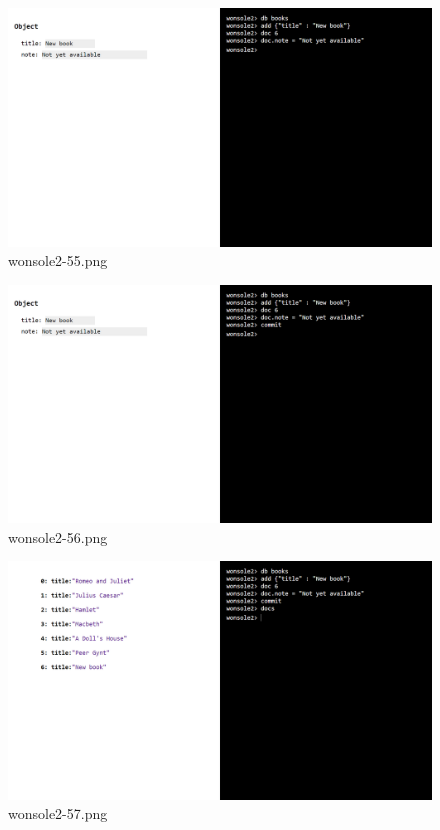 \clearpage
\begin{figure}
\includegraphics[width=\textwidth]{screenshot/wonsole2/wonsole2-55.png}
\caption{wonsole2-55.png}
\label{wonsole2-55.png}
\end{figure}


\begin{figure}
\includegraphics[width=\textwidth]{screenshot/wonsole2/wonsole2-56.png}
\caption{wonsole2-56.png}
\label{wonsole2-56.png}
\end{figure}


\clearpage
\begin{figure}
\includegraphics[width=\textwidth]{screenshot/wonsole2/wonsole2-57.png}
\caption{wonsole2-57.png}
\label{wonsole2-57.png}
\end{figure}


